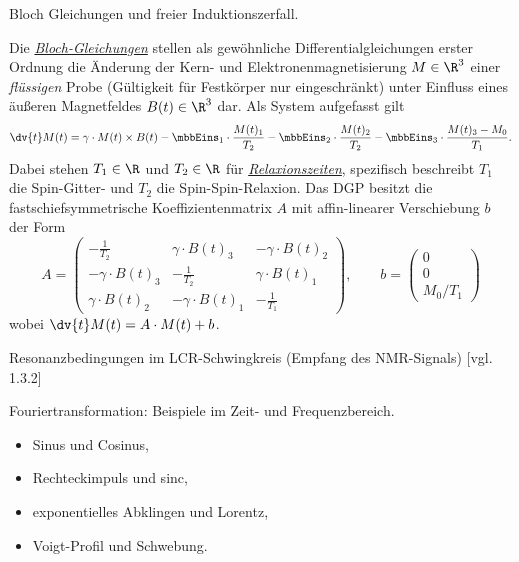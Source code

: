 \documentclass{subfiles}
\begin{document}
    \begin{Frage}
        Bloch Gleichungen und freier Induktionszerfall.
    \end{Frage}
    \begin{Antwort}
        Die \href{}{\emph{Bloch-Gleichungen}} stellen als gewöhnliche Differentialgleichungen erster Ordnung die Änderung der Kern- und Elektronenmagnetisierung $M\in\R^3$ einer \emph{flüssigen} Probe (Gültigkeit für Festkörper nur eingeschränkt) unter Einfluss eines äußeren Magnetfeldes $B(t)\in\R^3$ dar. Als System aufgefasst gilt 
        \[
            \dv{t}M(t) = \gamma\cdot M(t)\times B(t) - \mbbEins_1\cdot\frac{M(t)_1}{T_2} - \mbbEins_2\cdot\frac{M(t)_2}{T_2} - \mbbEins_3\cdot\frac{M(t)_3 - M_0}{T_1}.
        \]
        Dabei stehen $T_1\in\R$ und $T_2\in\R$ für \href{}{\emph{Relaxionszeiten}}, spezifisch beschreibt $T_1$ die Spin-Gitter- und $T_2$ die Spin-Spin-Relaxion. Das DGP besitzt die fastschiefsymmetrische Koeffizientenmatrix $A$ mit affin-linearer Verschiebung $b$ der Form
        \[
            A = \begin{pmatrix}
                -\frac{1}{T_2} & \gamma\cdot B(t)_3 & -\gamma\cdot B(t)_2 \\
                -\gamma\cdot B(t)_3 & -\frac{1}{T_2} & \gamma\cdot B(t)_1 \\
                \gamma\cdot B(t)_2 & -\gamma\cdot B(t)_1 & -\frac{1}{T_1}
            \end{pmatrix},\qquad b = \begin{pmatrix}
                0\\
                0\\
                M_0/T_1
            \end{pmatrix}
        \]
        wobei $\dv{t}M(t) = A\cdot M(t) + b$. \\
    \end{Antwort}

    \begin{Frage}
        Resonanzbedingungen im LCR-Schwingkreis (Empfang des NMR-Signals) [vgl. 1.3.2]
    \end{Frage}
    \begin{Antwort}
        
    \end{Antwort}

    \begin{Frage}
        Fouriertransformation: Beispiele im Zeit- und Frequenzbereich.
        \begin{itemize}[label=$\to$]
            \item Sinus und Cosinus,
            \item Rechteckimpuls und sinc,
            \item exponentielles Abklingen und Lorentz,
            \item Voigt-Profil und Schwebung.
        \end{itemize}
    \end{Frage}
    \begin{Antwort}
        
    \end{Antwort}
\end{document}
